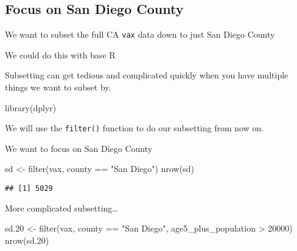 \documentclass[
]{article}
\newenvironment{Shaded}{\begin{snugshade}}{\end{snugshade}}
\newcommand{\CommentTok}[1]{\textcolor[rgb]{0.56,0.35,0.01}{\textit{#1}}}
\newcommand{\DecValTok}[1]{\textcolor[rgb]{0.00,0.00,0.81}{#1}}
\newcommand{\FloatTok}[1]{\textcolor[rgb]{0.00,0.00,0.81}{#1}}
\newcommand{\FunctionTok}[1]{\textcolor[rgb]{0.00,0.00,0.00}{#1}}
\newcommand{\NormalTok}[1]{#1}
\newcommand{\OtherTok}[1]{\textcolor[rgb]{0.56,0.35,0.01}{#1}}
\newcommand{\SpecialCharTok}[1]{\textcolor[rgb]{0.00,0.00,0.00}{#1}}
\newcommand{\StringTok}[1]{\textcolor[rgb]{0.31,0.60,0.02}{#1}}
\begin{document}
\hypertarget{focus-on-san-diego-county}{%
\subsection{Focus on San Diego County}\label{focus-on-san-diego-county}}

We want to subset the full CA \texttt{vax} data down to just San Diego
County

We could do this with base R

\begin{Shaded}
\end{Shaded}

Subsetting can get tedious and complicated quickly when you have
multiple things we want to subset by.

\begin{Shaded}
\begin{Highlighting}[]
\FunctionTok{library}\NormalTok{(dplyr)}
\end{Highlighting}
\end{Shaded}

We will use the \texttt{filter()} function to do our subsetting from now
on.

We want to focus on San Diego County

\begin{Shaded}
\begin{Highlighting}[]
\NormalTok{sd }\OtherTok{\textless{}{-}} \FunctionTok{filter}\NormalTok{(vax, county }\SpecialCharTok{==} \StringTok{"San Diego"}\NormalTok{)}
\FunctionTok{nrow}\NormalTok{(sd)}
\end{Highlighting}
\end{Shaded}

\begin{verbatim}
## [1] 5029
\end{verbatim}

More complicated subsetting\ldots{}

\begin{Shaded}
\begin{Highlighting}[]
\NormalTok{sd}\FloatTok{.20} \OtherTok{\textless{}{-}} \FunctionTok{filter}\NormalTok{(vax, county }\SpecialCharTok{==} \StringTok{"San Diego"}\NormalTok{, }
\NormalTok{       age5\_plus\_population }\SpecialCharTok{\textgreater{}} \DecValTok{20000}\NormalTok{)}
\FunctionTok{nrow}\NormalTok{(sd}\FloatTok{.20}\NormalTok{)}
\end{Highlighting}
\end{Shaded}
\end{document}
